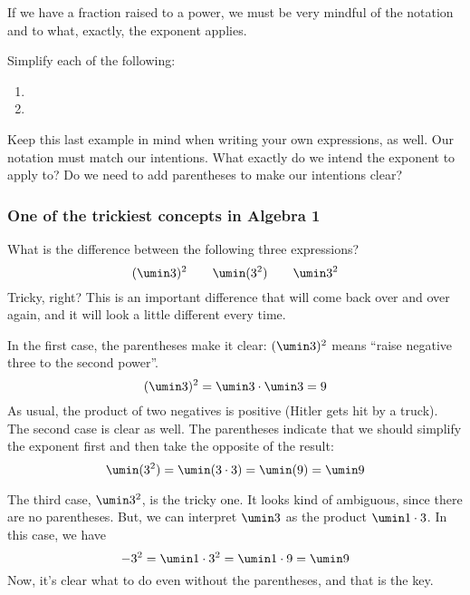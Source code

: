 If we have a fraction raised to a power, we must be very mindful of the notation and to what, exactly, the exponent applies.

\begin{boxex}
Simplify each of the following:

\begin{enumerate}[itemsep=10pt]
\item {}

\item {}
\end{enumerate}
\end{boxex}

Keep this last example in mind when writing your own expressions, as well. Our notation must match our intentions. What exactly do we intend the exponent to apply to? Do we need to add parentheses to make our intentions clear?

\subsubsection{One of the trickiest concepts in Algebra 1}

What is the difference between the following three expressions? \[(\umin3)^2 \qquad \umin(3^2) \qquad \umin3^2\]
Tricky, right? This is an important difference that will come back over and over again, and it will look a little different every time.

In the first case, the parentheses make it clear: $(\umin3)^2$ means ``raise negative three to the second power''.
\[(\umin3)^2 = \umin3 \cdot \umin3 = 9\]
As usual, the product of two negatives is positive (Hitler gets hit by a truck). The second case is clear as well. The parentheses indicate that we should simplify the exponent first and then take the opposite of the result:
\[\umin(3^2) = \umin(3\cdot3) = \umin(9) = \umin9\]

The third case, $\umin3^2$,  is the tricky one. It looks kind of ambiguous, since there are no parentheses. But, we can interpret $\umin3$ as the product $\umin1\cdot3$. In this case, we have
\[-3^2 = \umin1\cdot3^2 = \umin1\cdot9 = \umin9\]
Now, it's clear what to do even without the parentheses, and that is the key.

